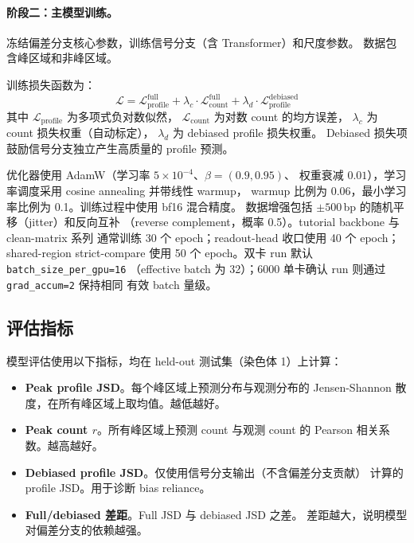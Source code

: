 \documentclass[11pt,a4paper]{ctexart}
\begin{document}
\paragraph{阶段二：主模型训练。}
冻结偏差分支核心参数，训练信号分支（含 Transformer）和尺度参数。
数据包含峰区域和非峰区域。

训练损失函数为：
\begin{equation}
  \mathcal{L} = \mathcal{L}_{\text{profile}}^{\text{full}}
    + \lambda_c \cdot \mathcal{L}_{\text{count}}^{\text{full}}
    + \lambda_d \cdot \mathcal{L}_{\text{profile}}^{\text{debiased}}
  \label{eq:loss}
\end{equation}
其中 $\mathcal{L}_{\text{profile}}$ 为多项式负对数似然，
$\mathcal{L}_{\text{count}}$ 为对数 count 的均方误差，
$\lambda_c$ 为 count 损失权重（自动标定），
$\lambda_d$ 为 debiased profile 损失权重。
Debiased 损失项鼓励信号分支独立产生高质量的 profile 预测。

优化器使用 AdamW（学习率 $5\times 10^{-4}$、$\beta=(0.9,0.95)$、
权重衰减 $0.01$），学习率调度采用 cosine annealing 并带线性 warmup，
warmup 比例为 0.06，最小学习率比例为 0.1。训练过程中使用 bf16 混合精度。
数据增强包括 $\pm 500$\,bp 的随机平移（jitter）和反向互补
（reverse complement，概率 0.5）。tutorial backbone 与 clean-matrix 系列
通常训练 30 个 epoch；readout-head 收口使用 40 个 epoch；shared-region
strict-compare 使用 50 个 epoch。双卡 run 默认 \texttt{batch\_size\_per\_gpu=16}
（effective batch 为 32）；6000 单卡确认 run 则通过 \texttt{grad\_accum=2} 保持相同
有效 batch 量级。

\subsection{评估指标}
\label{sec:metrics}

模型评估使用以下指标，均在 held-out 测试集（染色体 1）上计算：

\begin{itemize}[leftmargin=2em]
  \item \textbf{Peak profile JSD}。每个峰区域上预测分布与观测分布的
  Jensen-Shannon 散度，在所有峰区域上取均值。越低越好。
  \item \textbf{Peak count $r$}。所有峰区域上预测 count 与观测 count 的
  Pearson 相关系数。越高越好。
  \item \textbf{Debiased profile JSD}。仅使用信号分支输出（不含偏差分支贡献）
  计算的 profile JSD。用于诊断 bias reliance。
  \item \textbf{Full/debiased 差距}。Full JSD 与 debiased JSD 之差。
  差距越大，说明模型对偏差分支的依赖越强。
\end{itemize}
\end{document}
